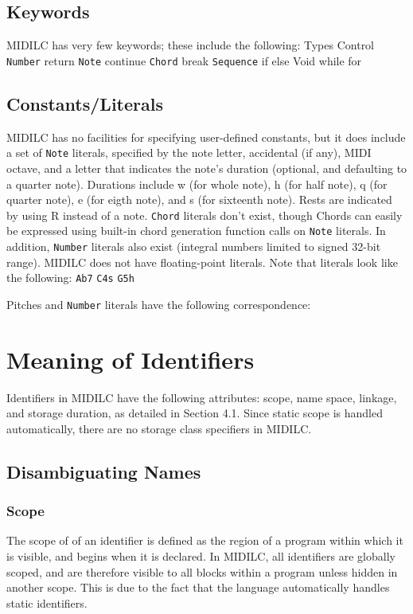 \documentclass[12pt,A4]{book}
\begin{document}
\subsection{Keywords}
MIDILC has very few keywords; these include the following:
Types	Control
\verb|Number|	return
\verb|Note|	continue
\verb|Chord|	break
\verb|Sequence|	if
	else
Void	while
	for


\subsection{Constants/Literals}
MIDILC has no facilities for specifying user-defined constants, but it does include a set of \verb|Note| literals, specified by the note letter, accidental (if any), MIDI octave, and a letter that indicates the note’s duration (optional, and defaulting to a quarter note).  Durations include w (for whole note), h (for half note), q (for quarter note), e (for eigth note), and s (for sixteenth note).  Rests are indicated by using R instead of a note. \verb|Chord| literals don’t exist, though Chords can easily be expressed using built-in chord generation function calls on \verb|Note| literals.  In addition, \verb|Number| literals also exist (integral numbers limited to signed 32-bit range).  MIDILC does not have floating-point literals.
Note that literals look like the following:
\verb|Ab7|
\verb|C4s|
\verb|G5h|

Pitches and \verb|Number| literals have the following correspondence:

\section{Meaning of Identifiers}
Identifiers in MIDILC have the following attributes: scope, name space, linkage, and storage duration, as detailed in Section 4.1. Since static scope is handled automatically, there are no storage class specifiers in MIDILC.
\subsection{Disambiguating Names}
\subsubsection{Scope}
The scope of of an identifier is defined as the region of a program within which it is visible, and begins when it is declared. In MIDILC, all identifiers are globally scoped, and are therefore visible to all blocks within a program unless hidden in another scope. This is due to the fact that the language automatically handles static identifiers.
\end{document}
